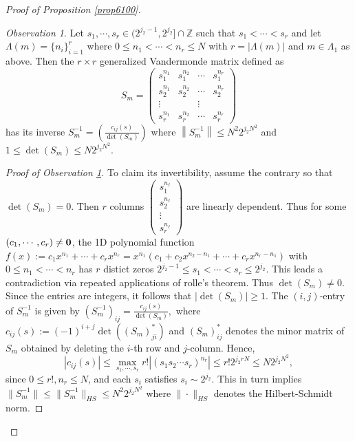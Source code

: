 \documentclass[11 pt,letterpaper]{amsart}
\theoremstyle{plain}
\theoremstyle{definition}
\theoremstyle{remark} \theoremstyle{exam} \theoremstyle{ob}
\newtheorem{ob}{Observation}\numberwithin{ob}{section}
\numberwithin{equation}{section}
\begin{document}
\begin{proof}[Proof of Proposition \ref{prop6100}]
\begin{ob}\label{lem7100} 
Let $s_1,\cdots,s_r\in (2^{j_2-1},2^{j_2}]\cap \mathbb{Z}$ such that $s_1<\cdots<s_r$ and let $\Lambda(m)=\{n_i\}_{i=1}^r$ where $0\le n_1<\cdots<n_r\le N$ with $r=|\Lambda(m)|$  and $m\in \Lambda_1$ as above. Then
  the $r\times r$ generalized Vandermonde matrix defined as
  $$S_m=\left(\begin{matrix}s_1^{n_{1}}&s_1^{n_{2}}& \cdots&s_1^{n_{r}}\\
s_2^{n_{1}}&s_2^{n_{2}}& \cdots&s_2^{n_{r}}\\
\vdots& &\vdots\\
s_{r}^{n_{1}}&s_{r}^{n_{2}}& \cdots&s_{r}^{n_{r}}
  \end{matrix}\right)   $$  has its inverse  $S^{-1}_m=\left(\frac{c_{ij}(s)}{\det(S_m)}\right)$ where $ \left\|S_m^{-1}\right\|\le N^{2} 2^{j_2N^2}$ and $1\le   \det(S_m)\le N 2^{j_2N^2}.$
\end{ob}
\begin{proof}[Proof of Observation \ref{lem7100}] To claim its invertibility, 
assume the contrary so that $\det (S_m)=0$. Then $r$ columns $\left(\begin{matrix}s_1^{n_{\ell}} \\
s_{2}^{n_{\ell}} \\
\vdots \\ 
s_{r}^{n_{\ell}} 
  \end{matrix}\right) $ are linearly dependent.  Thus for some $(c_1,\cdots,c_r)\ne {\bf 0}$, the 1D polynomial function $f(x):= c_1x^{n_1}+\cdots+c_r x^{n_r}=x^{n_1}(c_1+c_2x^{n_2-n_1}+\cdots+c_rx^{n_r-n_1})$ with $0\le n_1<\cdots<n_r$ has $r$ distict zeros $2^{j_2-1}\le s_1<\cdots<s_r\le 2^{j_2}$.  This leads a contradiction via repeated applications of rolle's theorem. Thus $\det(S_m)\ne 0 $.  
Since the   entries are integers,  it follows that  $|\det(S_m)|\ge 1$.  The $(i,j)$-entry  of $S^{-1}_m$ is  given by
$ (S_m^{-1})_{ij}=\frac{c_{ij}(s)}{\det(S_m)}, $ where   $c_{ij}(s):=(-1)^{i+j}\det((S_m)^{*}_{ji}) $ and $(S_m)^{*}_{ij}$ denotes the minor matrix  of $S_m$ obtained by deleting the $i$-th row and $j$-column. Hence, $$|c_{ij}(s)|\le\max_{s_1,\cdots,s_r} r!|(s_1  s_2 \cdots s_r)^{n_{r}}|\le r!2^{j_2 rN}\le N2^{j_2N^2},$$ since $0\le  r!, n_r\le N$, and each $s_i$ satisfies $s_i \sim 2^{j_2}$. This   in turn implies 
 $\|S_m^{-1}\|\le \|S_m^{-1}\|_{HS}\le    N^2 2^{j_2N^2}$ where $\| \cdot \|_{HS}$ denotes the Hilbert-Schmidt norm.
\end{proof}



\end{proof}
\end{document}
